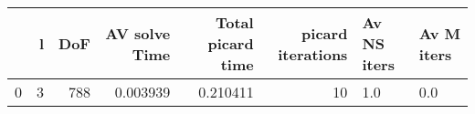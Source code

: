 \begin{tabular}{lrrrrrll}
\toprule
{} &  l &  DoF &  AV solve Time &  Total picard time &  picard iterations & Av NS iters & Av M iters \\
\midrule
0 &  3 &  788 &       0.003939 &           0.210411 &                 10 &         1.0 &        0.0 \\
\bottomrule
\end{tabular}
